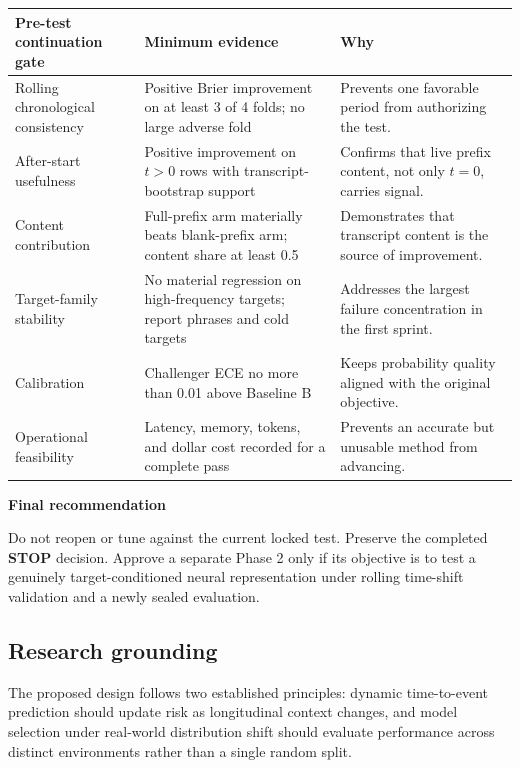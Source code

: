 \documentclass[10pt,a4paper]{article}
\begin{document}
\vspace{3mm}
\begin{tabularx}{\textwidth}{@{}L{47mm}L{42mm}Y@{}}
  \toprule
  \textbf{Pre-test continuation gate} & \textbf{Minimum evidence} & \textbf{Why}\\
  \midrule
  Rolling chronological consistency &
  Positive Brier improvement on at least 3 of 4 folds; no large adverse fold &
  Prevents one favorable period from authorizing the test.\\
  After-start usefulness &
  Positive improvement on \(t>0\) rows with transcript-bootstrap support &
  Confirms that live prefix content, not only \(t=0\), carries signal.\\
  Content contribution &
  Full-prefix arm materially beats blank-prefix arm; content share at least 0.5 &
  Demonstrates that transcript content is the source of improvement.\\
  Target-family stability &
  No material regression on high-frequency targets; report phrases and cold targets &
  Addresses the largest failure concentration in the first sprint.\\
  Calibration &
  Challenger ECE no more than 0.01 above Baseline B &
  Keeps probability quality aligned with the original objective.\\
  Operational feasibility &
  Latency, memory, tokens, and dollar cost recorded for a complete pass &
  Prevents an accurate but unusable method from advancing.\\
  \bottomrule
\end{tabularx}

\vspace{5mm}
\begin{keybox}
  {\large\bfseries Final recommendation}\par
  \vspace{1mm}
  Do not reopen or tune against the current locked test. Preserve the completed
  \textbf{STOP} decision. Approve a separate Phase 2 only if its objective is to test
  a genuinely target-conditioned neural representation under rolling time-shift
  validation and a newly sealed evaluation.
\end{keybox}

\vspace{5mm}
\subsection{Research grounding}
The proposed design follows two established principles: dynamic time-to-event
prediction should update risk as longitudinal context changes, and model selection
under real-world distribution shift should evaluate performance across distinct
environments rather than a single random split.
\end{document}
